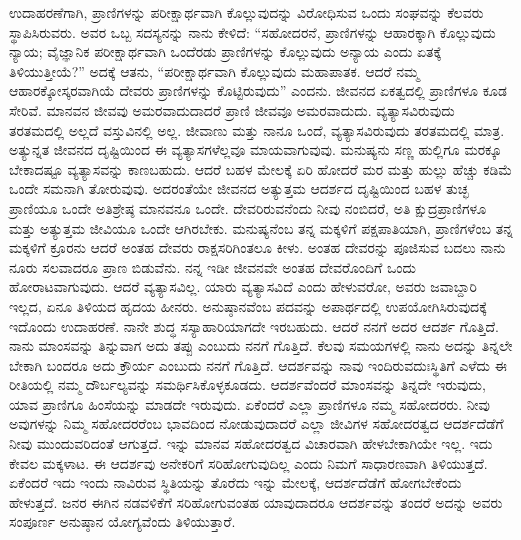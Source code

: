 \vskip 2pt

ಉದಾಹರಣೆಗಾಗಿ, ಪ್ರಾಣಿಗಳನ್ನು ಪರೀಕ್ಷಾರ್ಥವಾಗಿ ಕೊಲ್ಲುವುದನ್ನು ವಿರೋಧಿಸುವ ಒಂದು ಸಂಘವನ್ನು ಕೆಲವರು ಸ್ಥಾಪಿಸಿರುವರು. ಅವರ ಒಬ್ಬ ಸದಸ್ಯನನ್ನು ನಾನು ಕೇಳಿದೆ: “ಸಹೋದರನೆ, ಪ್ರಾಣಿಗಳನ್ನು ಆಹಾರಕ್ಕಾಗಿ ಕೊಲ್ಲುವುದು ನ್ಯಾಯ; ವೈಜ್ಞಾನಿಕ ಪರೀಕ್ಷಾರ್ಥವಾಗಿ ಒಂದೆರಡು ಪ್ರಾಣಿಗಳನ್ನು ಕೊಲ್ಲುವುದು ಅನ್ಯಾಯ ಎಂದು ಏತಕ್ಕೆ ತಿಳಿಯುತ್ತೀಯೆ?” ಅದಕ್ಕೆ ಆತನು, “ಪರೀಕ್ಷಾರ್ಥವಾಗಿ ಕೊಲ್ಲುವುದು ಮಹಾಪಾತಕ. ಆದರೆ ನಮ್ಮ ಆಹಾರಕ್ಕೋಸ್ಕರವಾಗಿಯೆ ದೇವರು ಪ್ರಾಣಿಗಳನ್ನು ಕೊಟ್ಟಿರುವುದು” ಎಂದನು. ಜೀವನದ ಏಕತ್ವದಲ್ಲಿ ಪ್ರಾಣಿಗಳೂ ಕೂಡ ಸೇರಿವೆ. ಮಾನವನ ಜೀವವು ಅಮರವಾದುದಾದರೆ ಪ್ರಾಣಿ ಜೀವವೂ ಅಮರವಾದುದು. ವ್ಯತ್ಯಾಸವಿರುವುದು ತರತಮದಲ್ಲಿ ಅಲ್ಲದೆ ವಸ್ತುವಿನಲ್ಲಿ ಅಲ್ಲ. ಜೀವಾಣು ಮತ್ತು ನಾನೂ ಒಂದೆ, ವ್ಯತ್ಯಾಸವಿರುವುದು ತರತಮದಲ್ಲಿ ಮಾತ್ರ. ಅತ್ಯುನ್ನತ ಜೀವನದ ದೃಷ್ಟಿಯಿಂದ ಈ ವ್ಯತ್ಯಾಸಗಳೆಲ್ಲವೂ ಮಾಯವಾಗುವುವು. ಮನುಷ್ಯನು ಸಣ್ಣ ಹುಲ್ಲಿಗೂ ಮರಕ್ಕೂ ಬೇಕಾದಷ್ಟೂ ವ್ಯತ್ಯಾಸವನ್ನು ಕಾಣಬಹುದು. ಆದರೆ ಬಹಳ ಮೇಲಕ್ಕೆ ಏರಿ ಹೋದರೆ ಮರ ಮತ್ತು ಹುಲ್ಲು ಹೆಚ್ಚು ಕಡಿಮೆ ಒಂದೇ ಸಮನಾಗಿ ತೋರುವುವು. ಅದರಂತೆಯೇ ಜೀವನದ ಅತ್ಯುತ್ತಮ ಆದರ್ಶದ ದೃಷ್ಟಿಯಿಂದ ಬಹಳ ತುಚ್ಛ ಪ್ರಾಣಿಯೂ ಒಂದೇ ಅತಿಶ್ರೇಷ್ಠ ಮಾನವನೂ ಒಂದೇ. ದೇವರಿರುವನೆಂದು ನೀವು ನಂಬಿದರೆ, ಅತಿ ಕ್ಷುದ್ರಪ್ರಾಣಿಗಳೂ ಮತ್ತು ಅತ್ಯುತ್ತಮ ಜೀವಿಯೂ ಒಂದೇ ಆಗಿರಬೇಕು. ಮನುಷ್ಯನೆಂಬ ತನ್ನ ಮಕ್ಕಳಿಗೆ ಪಕ್ಷಪಾತಿಯಾಗಿ, ಪ್ರಾಣಿಗಳೆಂಬ ತನ್ನ ಮಕ್ಕಳಿಗೆ ಕ್ರೂರನು ಆದರೆ ಅಂತಹ ದೇವರು ರಾಕ್ಷಸರಿಗಿಂತಲೂ ಕೀಳು. ಅಂತಹ ದೇವರನ್ನು ಪೂಜಿಸುವ ಬದಲು ನಾನು ನೂರು ಸಲವಾದರೂ ಪ್ರಾಣ ಬಿಡುವೆನು. ನನ್ನ ಇಡೀ ಜೀವನವೇ ಅಂತಹ ದೇವರೊಂದಿಗೆ ಒಂದು ಹೋರಾಟವಾಗುವುದು. ಆದರೆ ವ್ಯತ್ಯಾಸವಿಲ್ಲ. ಯಾರು ವ್ಯತ್ಯಾಸವಿದೆ ಎಂದು ಹೇಳುವರೋ, ಅವರು ಜವಾಬ್ದಾರಿ ಇಲ್ಲದ, ಏನೂ ತಿಳಿಯದ ಹೃದಯ ಹೀನರು. ಅನುಷ್ಠಾನವೆಂಬ ಪದವನ್ನು ಅಪಾರ್ಥದಲ್ಲಿ ಉಪಯೋಗಿಸಿರುವುದಕ್ಕೆ ಇದೊಂದು ಉದಾಹರಣೆ. ನಾನೇ ಶುದ್ಧ ಸಸ್ಯಾಹಾರಿಯಾಗದೇ ಇರಬಹುದು. ಆದರೆ ನನಗೆ ಅದರ ಆದರ್ಶ ಗೊತ್ತಿದೆ. ನಾನು ಮಾಂಸವನ್ನು ತಿನ್ನುವಾಗ ಅದು ತಪ್ಪು ಎಂಬುದು ನನಗೆ ಗೊತ್ತಿದೆ. ಕೆಲವು ಸಮಯಗಳಲ್ಲಿ ನಾನು ಅದನ್ನು ತಿನ್ನಲೇ ಬೇಕಾಗಿ ಬಂದರೂ ಅದು ಕ್ರೌರ್ಯ ಎಂಬುದು ನನಗೆ ಗೊತ್ತಿದೆ. ಆದರ್ಶವನ್ನು ನಾವು ಇಂದಿರುವದುಃಸ್ಥಿತಿಗೆ ಎಳೆದು ಈ ರೀತಿಯಲ್ಲಿ ನಮ್ಮ ದೌರ್ಬಲ್ಯವನ್ನು ಸಮರ್ಥಿಸಿಕೊಳ್ಳಕೂಡದು. ಆದರ್ಶವೆಂದರೆ ಮಾಂಸವನ್ನು ತಿನ್ನದೇ ಇರುವುದು, ಯಾವ ಪ್ರಾಣಿಗೂ ಹಿಂಸೆಯನ್ನು ಮಾಡದೇ ಇರುವುದು. ಏಕೆಂದರೆ ಎಲ್ಲಾ ಪ್ರಾಣಿಗಳೂ ನಮ್ಮ ಸಹೋದರರು. ನೀವು ಅವುಗಳನ್ನು ನಿಮ್ಮ ಸಹೋದರರೆಂಬ ಭಾವದಿಂದ ನೋಡುವುದಾದರೆ ಎಲ್ಲಾ ಜೀವಿಗಳ ಸಹೋದರತ್ವದ ಆದರ್ಶದೆಡೆಗೆ ನೀವು ಮುಂದುವರಿದಂತೆ ಆಗುತ್ತದೆ. ಇನ್ನು ಮಾನವ ಸಹೋದರತ್ವದ ವಿಚಾರವಾಗಿ ಹೇಳಬೇಕಾಗಿಯೇ ಇಲ್ಲ. ಇದು ಕೇವಲ ಮಕ್ಕಳಾಟ. ಈ ಆದರ್ಶವು ಅನೇಕರಿಗೆ ಸರಿಹೋಗುವುದಿಲ್ಲ ಎಂದು ನಿಮಗೆ ಸಾಧಾರಣವಾಗಿ ತಿಳಿಯುತ್ತದೆ. ಏಕೆಂದರೆ ಇದು ಇಂದು ನಾವಿರುವ ಸ್ಥಿತಿಯನ್ನು ತೊರೆದು ಇನ್ನು ಮೇಲಕ್ಕೆ, ಆದರ್ಶದೆಡೆಗೆ ಹೋಗಬೇಕೆಂದು ಹೇಳುತ್ತದೆ. ಜನರ ಈಗಿನ ನಡವಳಿಕೆಗೆ ಸರಿಹೋಗುವಂತಹ ಯಾವುದಾದರೂ ಆದರ್ಶವನ್ನು ತಂದರೆ ಅದನ್ನು ಅವರು ಸಂಪೂರ್ಣ ಅನುಷ್ಠಾನ ಯೋಗ್ಯವೆಂದು ತಿಳಿಯುತ್ತಾರೆ. 

